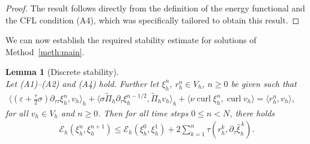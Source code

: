 \documentclass[12pt,reqno,a4paper]{amsart}
\newtheorem{lemma}{Lemma}[section]
\theoremstyle{definition}
\def\EE{\mathscr{E}}
\def\dtautau{\partial_{\tau\tau}}
\def\dtau{\partial_{\tau}}
\def\curl{\operatorname{curl}}
\def\wPi{\widetilde\Pi}
\def\a{{a}}
\def\r{{r}}
\def\wh{\widehat}
\def\eps{\varepsilon}
\def\la{\langle}
\def\ra{\rangle}
\begin{document}
\begin{proof}

The result follows directly from the definition of the energy functional and the CFL condition (A4), which was specifically tailored to obtain this result.
\end{proof}

We can now establish the required stability estimate for solutions of Method~\ref{meth:main}. 
\def\a{\xi}
\begin{lemma}[Discrete stability] $ $\label{lem:discrete} \\
Let (A1)--(A2) and (A4) hold.
Further let $\a_h^n$, $\r_h^n \in V_h$, $n \ge 0$ be given such that
\begin{align} \label{eq:discreteeq}
\la(\eps + \tfrac\tau2\sigma) \dtautau \a_h^n,v_h\ra_h  + \la\sigma\wPi_h \dtau  \a_h^{n-1/2},\wPi_h v_h\ra_h + \la\nu\curl \a_h^n,\curl v_h\ra = \la r_h^n,v_h\ra, \qquad 
\end{align}
for all $v_h\in V_h$ and $n\ge 0$.
Then for all time steps $0 \le n <N$, there holds
\begin{align*}
\EE_h(\a_h^n,\a_h^{n+1}) \le \EE_h(\a_h^0,\a_h^1) + 2 \sum\nolimits_{k=1}^{n} \tau (\r_h^k,\dtau \wh\a_h^{\,k}).
\end{align*}
\end{lemma}
\end{document}
